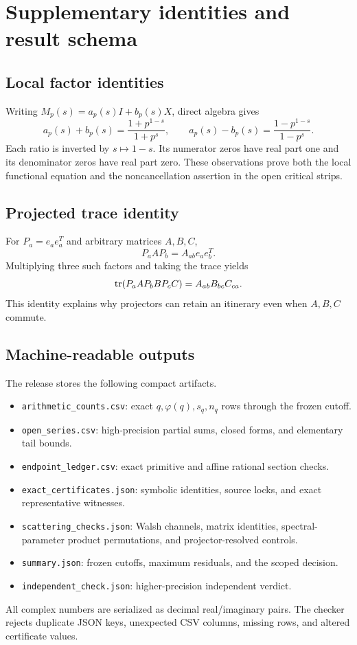 \section{Supplementary identities and result schema}

\subsection{Local factor identities}

Writing \(M_p(s)=a_p(s)I+b_p(s)X\), direct algebra gives
\[
a_p(s)+b_p(s)=\frac{1+p^{1-s}}{1+p^s},\qquad
a_p(s)-b_p(s)=\frac{1-p^{1-s}}{1-p^s}.
\]
Each ratio is inverted by \(s\mapsto1-s\).  Its numerator zeros have real
part one and its denominator zeros have real part zero.  These observations
prove both the local functional equation and the noncancellation assertion in
the open critical strips.

\subsection{Projected trace identity}

For \(P_a=e_ae_a^T\) and arbitrary matrices \(A,B,C\),
\[
P_aAP_b=A_{ab}e_ae_b^T.
\]
Multiplying three such factors and taking the trace yields
\[
\operatorname{tr}(P_aAP_bBP_cC)=A_{ab}B_{bc}C_{ca}.
\]
This identity explains why projectors can retain an itinerary even when
\(A,B,C\) commute.

\subsection{Machine-readable outputs}

The release stores the following compact artifacts.

\begin{itemize}
\item \texttt{arithmetic\_counts.csv}: exact \(q,\varphi(q),s_q,n_q\)
rows through the frozen cutoff.
\item \texttt{open\_series.csv}: high-precision partial sums, closed forms,
and elementary tail bounds.
\item \texttt{endpoint\_ledger.csv}: exact primitive and affine rational
section checks.
\item \texttt{exact\_certificates.json}: symbolic identities, source locks,
and exact representative witnesses.
\item \texttt{scattering\_checks.json}: Walsh channels, matrix identities,
spectral-parameter product permutations, and projector-resolved controls.
\item \texttt{summary.json}: frozen cutoffs, maximum residuals, and the scoped
decision.
\item \texttt{independent\_check.json}: higher-precision independent verdict.
\end{itemize}

All complex numbers are serialized as decimal real/imaginary pairs.  The
checker rejects duplicate JSON keys, unexpected CSV columns, missing rows,
and altered certificate values.
